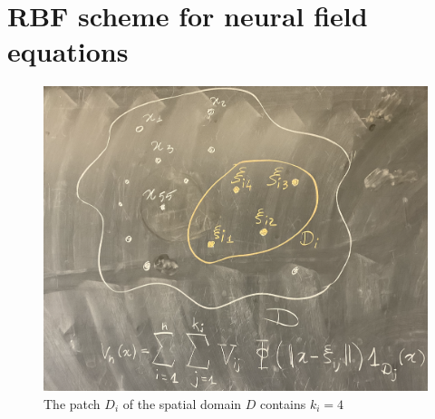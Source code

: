 \documentclass[a4paper]{siamart190516}
\begin{document}
\section{RBF scheme for neural field equations}\label{sec:RBFScheme} 
\begin{figure}
  \centering
  \includegraphics[width=\textwidth]{sketch}
  \caption{The patch $D_i$ of the spatial domain $D$ contains $k_i =4$}
  \label{fig:sketch}
\end{figure}
\end{document}

